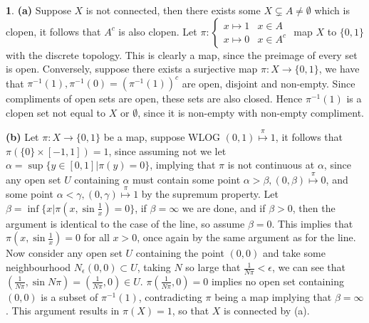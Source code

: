 \documentclass[10.5pt]{article}
\theoremstyle{definition}
\newtheorem{pb}{}
\newcommand{\set}[1]{\{#1\}}
\begin{document}
    \begin{pb}
        \textbf{(a)} Suppose \(X\) is not connected, then there exists some \(X \subsetneq A \neq \emptyset\) which is clopen, it follows that
        \(A^c\) is also clopen. Let \(\pi: \begin{cases} x \mapsto 1 & x \in A \\ x \mapsto 0 &x\in A^c\end{cases}\) map \(X\) to \(\set{0,1}\) with the discrete topology.
        This is clearly a map, since the preimage of every set is open. Conversely, suppose there exists a surjective map \(\pi:X \to \set{0,1}\),
        we have that \(\pi^{-1}(1), \pi^{-1}(0) = (\pi^{-1}(1))^c\) are open, disjoint and non-empty. Since compliments of open sets are open, these sets are also closed.
        Hence \(\pi^{-1}(1)\) is a clopen set not equal to \(X\) or \(\emptyset\), since it is non-empty with non-empty compliment.

        \textbf{(b)} Let \(\pi:X\to \set{0,1}\) be a map, suppose WLOG \((0,1)\overset{\pi}{\mapsto}1\), it follows that \(\pi(\set{0}\times[-1,1]) = 1\), since
        assuming not we let \(\alpha = \sup\set{y \in [0,1]\vert \pi(y) = 0}\), implying that \(\pi\) is not continuous at \(\alpha\), since any open set
        \(U\) containing \(\alpha\) must contain some point \(\alpha > \beta, (0,\beta)\overset{\pi}{\mapsto}0\), and some point \(\alpha < \gamma, (0,\gamma)\overset{\pi}{\mapsto}1\) 
        by the supremum property. Let \(\beta = \inf \set{x\vert \pi(x,\sin\frac{1}{x}) = 0}\), if \(\beta=\infty\) we are done, and if \(\beta>0\), then the argument is
        identical to the case of the line, so assume \(\beta=0\). This implies that \(\pi(x,\sin \frac{1}{x}) = 0\) for all \(x > 0\), once again by the same argument
        as for the line. Now consider any open set \(U\) containing the point \((0,0)\) and take some neighbourhood \(N_\epsilon(0,0) \subset U\), taking
        \(N\) so large that \(\frac{1}{N\pi} < \epsilon\), we can see that \((\frac{1}{N\pi},\sin N\pi) = (\frac{1}{N\pi},0) \in U\). 
        \(\pi(\frac{1}{N\pi},0) = 0\) implies no open set containing \((0,0)\) is a subset of \(\pi^{-1}(1)\), contradicting \(\pi\) being a map implying that \(\beta = \infty\).
        This argument results in \(\pi(X) = 1\), so that \(X\) is connected by (a).


\end{pb}
\end{document}
